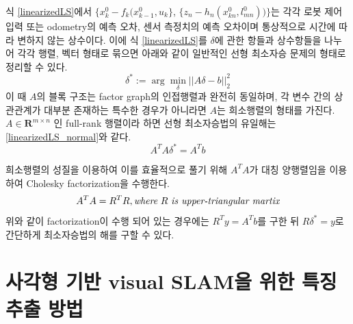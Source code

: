 \documentclass[master,korean,final]{cbnu-ecs}
\begin{document}
식 \eqref{linearizedLS}에서 $\{x_k^0 - f_k(x^0_{k-1}, u_k\}$, $\{z_n - h_n(x^0_{kn}, l^0_{mn})) \}$는 각각 로봇 제어 입력 또는 odometry의 예측 오차, 센서 측정치의 예측 오차이며 통상적으로 시간에 따라 변하지 않는 상수이다. 이에 식 \eqref{linearizedLS}를 $\delta$에 관한 항들과 상수항들을 나누어 각각 행렬, 벡터 형태로 묶으면 아래와 같이 일반적인 선형 최소자승 문제의 형태로 정리할 수 있다.
\begin{equation}
\label{linearizedLS_simple}
\delta^*:=\arg\min_\delta || A\delta - b ||^2_2
\end{equation}
이 때 $A$의 블록 구조는 factor graph의 인접행렬과 완전히 동일하며, 각 변수 간의 상관관계가 대부분 존재하는 특수한 경우가 아니라면 $A$는 희소행렬의 형태를 가진다.
$A \in \mathbf{R}^{m\times n}$ 인 full-rank 행렬이라 하면 선형 최소자승법의 유일해는 \eqref{linearizedLS_normal}와 같다.
\begin{equation}
\label{linearizedLS_normal}
A^T A\delta^*= A^T b
\end{equation}
 
희소행렬의 성질을 이용하여 이를 효율적으로 풀기 위해 $A^T A$가 대칭 양행렬임을 이용하여 Cholesky factorization을 수행한다.
\begin{equation}
\label{cholesky}
A^T A = R^T R, \emph{where}\ R\ \emph{is upper-triangular martix}
\end{equation}
위와 같이 factorization이 수행 되어 있는 경우에는 $R^T y=A^T b$를 구한 뒤 $R\delta^*=y$로 간단하게 최소자승법의 해를 구할 수 있다. 

\newpage
\chapter{사각형 기반 visual SLAM을 위한 특징 추출 방법}
\end{document}
